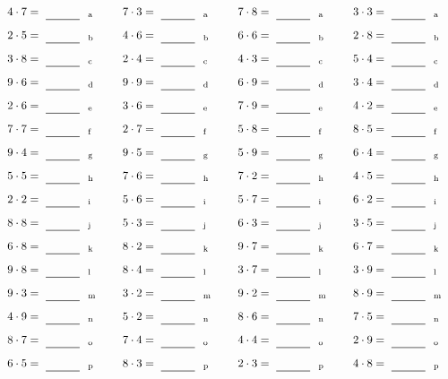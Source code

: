 \documentclass
[
  draft    = true,
  fontsize = 11pt,
  parskip  = half-
]
{scrartcl}
\begin{document}
\par\vfill\par
\begin{align*}
    \pline{4\cdot7}&=\rline{a}
  & \pline{7\cdot3}&=\rline{a}
  & \pline{7\cdot8}&=\rline{a}
  & \pline{3\cdot3}&=\rline{a} \\[1ex]
    \pline{2\cdot5}&=\rline{b}
  & \pline{4\cdot6}&=\rline{b}
  & \pline{6\cdot6}&=\rline{b}
  & \pline{2\cdot8}&=\rline{b} \\[1ex]
    \pline{3\cdot8}&=\rline{c}
  & \pline{2\cdot4}&=\rline{c}
  & \pline{4\cdot3}&=\rline{c}
  & \pline{5\cdot4}&=\rline{c} \\[1ex]
    \pline{9\cdot6}&=\rline{d}
  & \pline{9\cdot9}&=\rline{d}
  & \pline{6\cdot9}&=\rline{d}
  & \pline{3\cdot4}&=\rline{d} \\[1ex]
    \pline{2\cdot6}&=\rline{e}
  & \pline{3\cdot6}&=\rline{e}
  & \pline{7\cdot9}&=\rline{e}
  & \pline{4\cdot2}&=\rline{e} \\[1ex]
    \pline{7\cdot7}&=\rline{f}
  & \pline{2\cdot7}&=\rline{f}
  & \pline{5\cdot8}&=\rline{f}
  & \pline{8\cdot5}&=\rline{f} \\[1ex]
    \pline{9\cdot4}&=\rline{g}
  & \pline{9\cdot5}&=\rline{g}
  & \pline{5\cdot9}&=\rline{g}
  & \pline{6\cdot4}&=\rline{g} \\[1ex]
    \pline{5\cdot5}&=\rline{h}
  & \pline{7\cdot6}&=\rline{h}
  & \pline{7\cdot2}&=\rline{h}
  & \pline{4\cdot5}&=\rline{h} \\[1ex]
    \pline{2\cdot2}&=\rline{i}
  & \pline{5\cdot6}&=\rline{i}
  & \pline{5\cdot7}&=\rline{i}
  & \pline{6\cdot2}&=\rline{i} \\[1ex]
    \pline{8\cdot8}&=\rline{j}
  & \pline{5\cdot3}&=\rline{j}
  & \pline{6\cdot3}&=\rline{j}
  & \pline{3\cdot5}&=\rline{j} \\[1ex]
    \pline{6\cdot8}&=\rline{k}
  & \pline{8\cdot2}&=\rline{k}
  & \pline{9\cdot7}&=\rline{k}
  & \pline{6\cdot7}&=\rline{k} \\[1ex]
    \pline{9\cdot8}&=\rline{l}
  & \pline{8\cdot4}&=\rline{l}
  & \pline{3\cdot7}&=\rline{l}
  & \pline{3\cdot9}&=\rline{l} \\[1ex]
    \pline{9\cdot3}&=\rline{m}
  & \pline{3\cdot2}&=\rline{m}
  & \pline{9\cdot2}&=\rline{m}
  & \pline{8\cdot9}&=\rline{m} \\[1ex]
    \pline{4\cdot9}&=\rline{n}
  & \pline{5\cdot2}&=\rline{n}
  & \pline{8\cdot6}&=\rline{n}
  & \pline{7\cdot5}&=\rline{n} \\[1ex]
    \pline{8\cdot7}&=\rline{o}
  & \pline{7\cdot4}&=\rline{o}
  & \pline{4\cdot4}&=\rline{o}
  & \pline{2\cdot9}&=\rline{o} \\[1ex]
    \pline{6\cdot5}&=\rline{p}
  & \pline{8\cdot3}&=\rline{p}
  & \pline{2\cdot3}&=\rline{p}
  & \pline{4\cdot8}&=\rline{p}
\end{align*}
\end{document}
